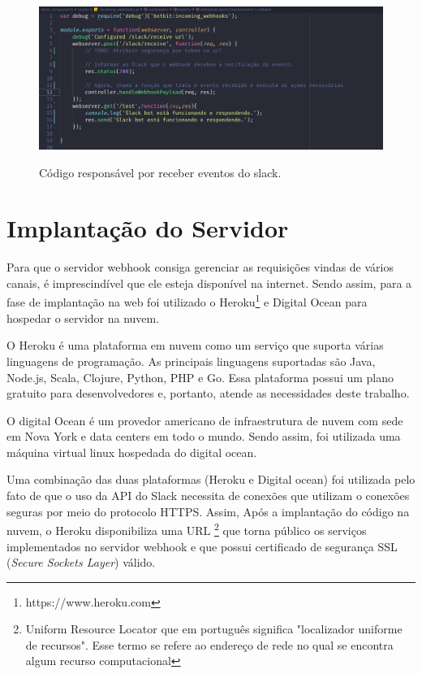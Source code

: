 \begin{figure}[H]
  \centering
   \caption{Código responsável por receber eventos do slack.}
  \includegraphics[scale=0.3]{Imagens/webhook-code-slack.png} 
  \label{webhook-slack-config}
\end{figure}




\section{Implantação do Servidor}

Para que o servidor webhook consiga gerenciar as requisições vindas de vários canais, é imprescindível que ele esteja disponível na internet. Sendo assim, para a fase de implantação na web foi utilizado o Heroku\footnote{https://www.heroku.com} e Digital Ocean para hospedar o servidor na nuvem. 

O Heroku é uma plataforma em nuvem como um serviço que suporta várias linguagens de programação. As principais linguagens suportadas são Java, Node.js, Scala, Clojure, Python, PHP e Go. Essa plataforma possui um plano gratuito para desenvolvedores e, portanto, atende as necessidades deste trabalho.

O digital Ocean é um provedor americano de infraestrutura de nuvem com sede em Nova York e data centers em todo o mundo. Sendo assim, foi utilizada uma máquina virtual linux hospedada do digital ocean.

Uma combinação das duas plataformas (Heroku e Digital ocean) foi utilizada pelo fato de que o uso da API do Slack necessita de conexões que utilizam o conexões seguras por meio do protocolo HTTPS. Assim, Após a implantação do código na nuvem, o Heroku disponibiliza uma URL \footnote{Uniform Resource Locator que em português significa "localizador uniforme de recursos". Esse termo se refere ao endereço de rede no qual se encontra algum recurso computacional} que torna público os serviços implementados no servidor webhook e que possui certificado de segurança SSL (\textit{Secure Sockets Layer}) válido. 


